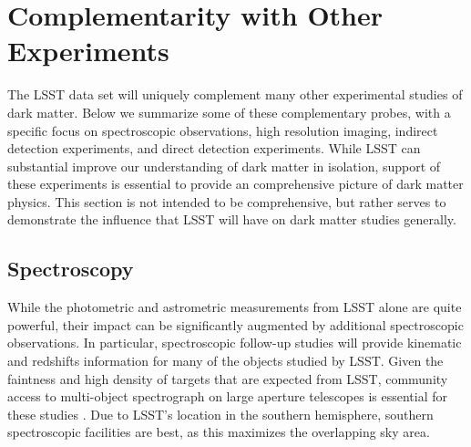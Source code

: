 \chapter{Complementarity with Other Experiments}
\label{sec:complementarity}
\bigskip

The LSST data set will uniquely complement many other experimental studies of dark matter.
Below we summarize some of these complementary probes, with a specific focus on spectroscopic observations, high resolution imaging, indirect detection experiments, and direct detection experiments.
While LSST can substantial improve our understanding of dark matter in isolation, support of these experiments is essential to provide an comprehensive picture of dark matter physics.
This section is not intended to be comprehensive, but rather serves to demonstrate the influence that LSST will have on dark matter studies generally.

\section{Spectroscopy }
 \label{sec:spectroscopy}


While the photometric and astrometric measurements from LSST alone are quite powerful, their impact can be significantly augmented by additional spectroscopic observations. 
In particular, spectroscopic follow-up studies will provide kinematic and redshifts information for many of the objects studied by LSST.
Given the faintness and high density of targets that are expected from LSST, community access to multi-object spectrograph on large aperture telescopes is essential for these studies \citep{2016arXiv161001661N}. 
Due to LSST's location in the southern hemisphere, southern spectroscopic facilities are best, as this  maximizes the overlapping sky area.

